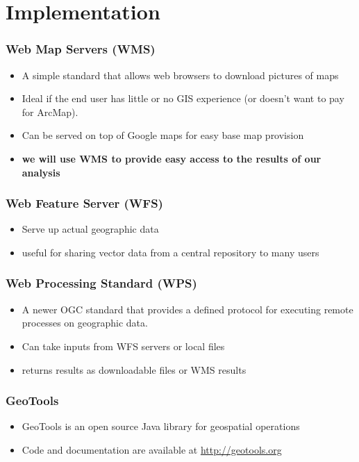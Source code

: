 \documentclass{beamer}
\begin{document}
\section{Implementation}
\begin{frame}[t]
\frametitle{Web Map Servers (WMS)}
\begin{itemize}
\item A simple standard that allows web browsers to download pictures of maps
\item Ideal if the end user has little or no GIS experience (or doesn’t want to pay for ArcMap). 
\item Can be served on top of Google maps for easy base map provision
\item \textbf{we will use WMS to provide easy access to the results of our analysis}
\end{itemize}
\end{frame}
\begin{frame}[t]
\frametitle{Web Feature Server (WFS)}
\begin{itemize}
\item Serve up actual geographic data 
\item useful for sharing vector data from a central repository to many users

\end{itemize}
\end{frame}
\begin{frame}[t]
\frametitle{Web Processing Standard (WPS)}
\begin{itemize}

\item A newer OGC standard \citep{OGC2007} that provides a defined protocol for executing remote processes on geographic data.
\item Can take inputs from WFS servers or local files
\item returns results as downloadable files or WMS results
\end{itemize}
\end{frame}


\begin{frame}[t]
\frametitle{GeoTools}
\begin{itemize}
\item GeoTools is an open source Java library for geospatial operations \citep{Hall2008}
\item Code and documentation are available at \url{http://geotools.org}
\end{itemize}
\end{frame}
\end{document}
